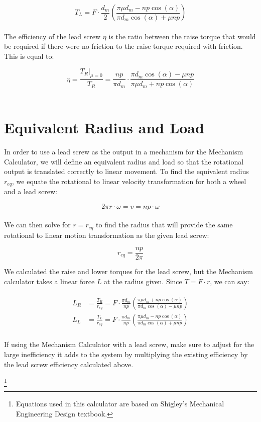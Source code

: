 \documentclass[a4paper]{article}
\newcommand\blfootnote[1]{%
	\begingroup
	\renewcommand\thefootnote{}\footnote{#1}%
	\addtocounter{footnote}{-1}%
	\endgroup
}
\begin{document}
	\begin{equation}
		T_L = F \cdot \frac{d_m}{2} \left( \frac{\pi \mu d_m - n p \cos (\alpha)}{\pi d_m \cos (\alpha) + \mu n p} \right)
	\end{equation}
	\\
	The efficiency of the lead screw $ \eta $ is the ratio between the raise torque that would be required if there were no friction to the raise torque required with friction. This is equal to:
	
	\begin{equation}
		\eta = \frac{T_R |_{\mu=0}}{T_R} = \frac{np}{\pi d_m} \cdot \frac{\pi d_m \cos (\alpha) - \mu n p}{\pi \mu d_m + n p \cos (\alpha)}
	\end{equation}
	\\
	
	\section*{Equivalent Radius and Load}
	
	In order to use a lead screw as the output in a mechanism for the Mechanism Calculator, we will define an equivalent radius and load so that the rotational output is translated correctly to linear movement. To find the equivalent radius $ r_{eq} $, we equate the rotational to linear velocity transformation for both a wheel and a lead screw:

	\begin{equation}
		2\pi r \cdot \omega = v = np \cdot \omega
	\end{equation}
	\\
	We can then solve for $ r = r_{eq} $ to find the radius that will provide the same rotational to linear motion transformation as the given lead screw:
	
	\begin{equation}
		r_{eq} = \frac{np}{2\pi}
	\end{equation}
	
	\newpage
	We calculated the raise and lower torques for the lead screw, but the Mechanism calculator takes a linear force $ L $ at the radius given. Since $ T = F \cdot r $, we can say:
	
	\begin{gather}
	\begin{aligned}
		L_R &= \frac{T_R}{r_{eq}} = F \cdot \frac{\pi d_m}{np} \left( \frac{\pi \mu d_m + n p \cos (\alpha)}{\pi d_m \cos (\alpha) - \mu n p} \right) \\
		L_L &= \frac{T_L}{r_{eq}} = F \cdot \frac{\pi d_m}{np} \left( \frac{\pi \mu d_m - n p \cos (\alpha)}{\pi d_m \cos (\alpha) + \mu n p} \right)
	\end{aligned}
	\end{gather}
	\\
	If using the Mechanism Calculator with a lead screw, make sure to adjust for the large inefficiency it adds to the system by multiplying the existing efficiency by the lead screw efficiency calculated above.
	
	
	\blfootnote{Equations used in this calculator are based on Shigley's Mechanical Engineering Design textbook.}
	
	
	
	
\end{document}
